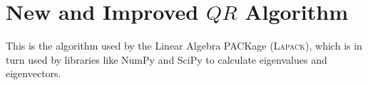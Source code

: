 \documentclass{article}
\begin{document}
%


\section{New and Improved $QR$ Algorithm}

This is the algorithm used by the Linear Algebra PACKage (\textsc{Lapack}), which is in turn used by libraries like NumPy and SciPy to calculate eigenvalues and eigenvectors.
\end{document}
